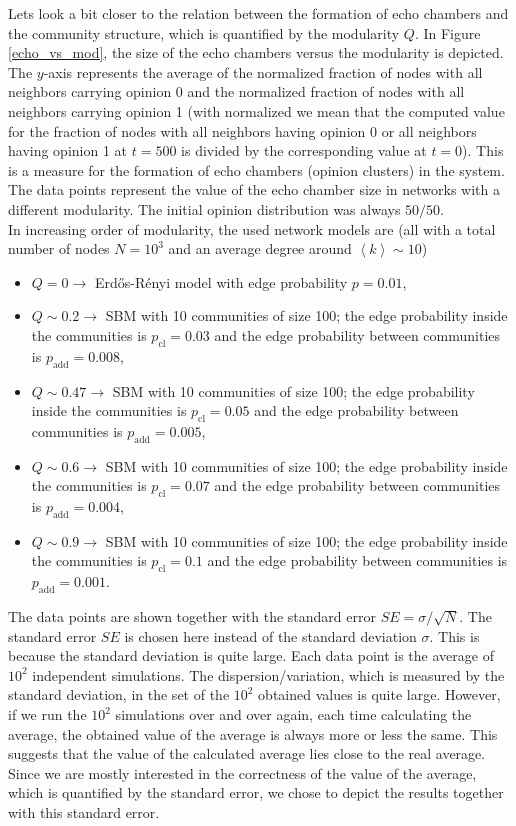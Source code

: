 \documentclass[11 pt , letterpaper , twoside , openright]{book}
\begin{document}
Lets look a bit closer to the relation between the formation of echo chambers and the community structure, which is quantified by the modularity $Q$. In Figure \ref{echo_vs_mod}, the size of the echo chambers versus the modularity is depicted. The $y$-axis represents the average of the normalized fraction of nodes with all neighbors carrying opinion 0 and the normalized fraction of nodes with all neighbors carrying opinion 1 (with normalized we mean that the computed value for the fraction of nodes with all neighbors having opinion 0 or all neighbors having opinion 1 at $t=500$ is divided by the corresponding value at $t=0$). This is a measure for the formation of echo chambers (opinion clusters) in the system. The data points represent the value of the echo chamber size in networks with a different modularity. The initial opinion distribution was always $50/50$. \\
\newpage
\noindent
In increasing order of modularity, the used network models are (all with a total number of nodes $N = 10^3$ and an average degree around $\left<k\right> \sim 10$)
\begin{itemize}
	\item $Q=0 \rightarrow$ Erd\H{o}s-R\'{e}nyi model with edge probability $p=0.01$,
	\item $Q \sim 0.2 \rightarrow$ SBM with 10 communities of size 100; the edge probability inside the communities is $p_{\text{cl}} = 0.03$ and the edge probability between communities is $p_{\text{add}} = 0.008$,
	\item $Q \sim 0.47 \rightarrow$ SBM with 10 communities of size 100; the edge probability inside the communities is $p_{\text{cl}} = 0.05$ and the edge probability between communities is $p_{\text{add}} = 0.005$,
	\item $Q \sim 0.6 \rightarrow$ SBM with 10 communities of size 100; the edge probability inside the communities is $p_{\text{cl}} = 0.07$ and the edge probability between communities is $p_{\text{add}} = 0.004$,
	\item $Q \sim 0.9 \rightarrow$ SBM with 10 communities of size 100; the edge probability inside the communities is $p_{\text{cl}} = 0.1$ and the edge probability between communities is $p_{\text{add}} = 0.001$.
\end{itemize}
The data points are shown together with the standard error $SE = \sigma /\sqrt{N}$. The standard error $SE$ is chosen here instead of the standard deviation $\sigma$. This is because the standard deviation is quite large. Each data point is the average of $10^2$ independent simulations. The dispersion/variation, which is measured by the standard deviation, in the set of the $10^2$ obtained values is quite large. However, if we run the $10^2$ simulations over and over again, each time calculating the average, the obtained value of the average is always more or less the same. This suggests that the value of the calculated average lies close to the real average. Since we are mostly interested in the correctness of the value of the average, which is quantified by the standard error, we chose to depict the results together with this standard error.\\
\end{document}
